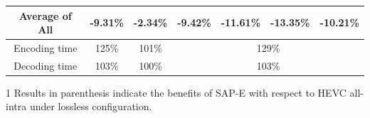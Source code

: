 \documentclass[journal]{IEEEtran}
\begin{document}
\begin{table}[htbp]
\begin{tabular}{c|c|c|c|cccc}
\multicolumn{2}{c|}{Average of All}                                                                             & -9.31\%  & -2.34\% & -9.42\%  & -11.61\% & -13.35\% & -10.21\%                                                      \\ \midrule[1pt]
\multicolumn{2}{c|}{Encoding time}                                                                              & 125\%    & 101\%   & \multicolumn{4}{c}{129\%}                                                                     \\ \midrule[1pt]
\multicolumn{2}{c|}{Decoding time}                                                                              & 103\%    & 100\%   & \multicolumn{4}{c}{103\%}                                                                     \\ \bottomrule
\end{tabular}
\begin{tablenotes}
       \footnotesize
       \item[1]Results in parenthesis \cite{13} indicate the benefits of SAP-E \cite{09}       with respect to HEVC all-intra under lossless configuration.       
     \end{tablenotes}

\end{table}
\end{document}
